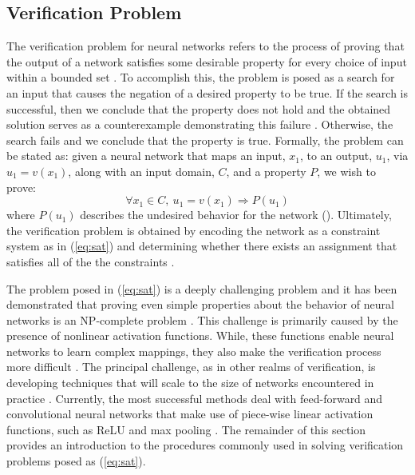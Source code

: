 \documentclass[10pt,conference]{IEEEtran}
\begin{document}
\subsection{Verification Problem}
The verification problem for neural networks refers to the process of proving that the output of a network satisfies some desirable property for every choice of input within a bounded set \cite{KrishnamurthyDual2018}. To accomplish this, the problem is posed as a search for an input that causes the negation of a desired property to be true. If the search is successful, then we conclude that the property does not hold and the obtained solution serves as a counterexample demonstrating this failure \cite{KatzLecture_2018}. Otherwise, the search fails and we conclude that the property is true.
Formally, the problem can be stated as: given a neural network that maps an input, $x_1$, to an output, $u_1$, via $u_1=v(x_1)$, along with an input domain, $C$, and a property $P$, we wish to prove:
\begin{equation}
    \forall x_1 \in C, \ u_1=v(x_1) \Rightarrow P(u_1)  \label{eq:sat}
\end{equation}
where $P(u_1)$ describes the undesired behavior for the network (\cite{KatzLecture_2018, KrishnamurthyDual2018}). Ultimately, the verification problem is obtained by encoding the network as a constraint system as in (\ref{eq:sat}) and determining whether there exists an assignment that satisfies all of the the constraints \cite{LeofanteAdvances2018}.

The problem posed in (\ref{eq:sat}) is a deeply challenging problem and it has been demonstrated that proving even simple properties about the behavior of neural networks is an NP-complete problem \cite{KatzReluplex2017}. This challenge is primarily caused by the presence of nonlinear activation functions. While, these functions enable neural networks to learn complex mappings, they also make the verification process more difficult \cite{KuperScalableVerification2018}. The principal challenge, as in other realms of verification, is developing techniques that will scale to the size of networks encountered in practice \cite{AlurFormalVerificationHybridSystems}. Currently, the most successful methods deal with feed-forward and convolutional neural networks that make use of piece-wise linear activation functions, such as ReLU and max pooling \cite{BunelPiecewise2017}. The remainder of this section provides an introduction to the procedures commonly used in solving verification problems posed as (\ref{eq:sat}).
\end{document}
